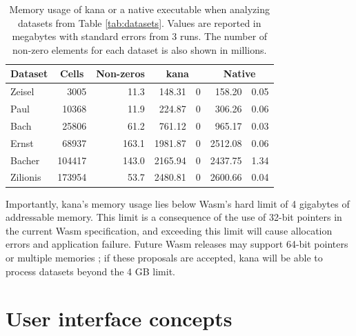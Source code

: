 \documentclass{article}
\begin{document}
\begin{table}
    \caption{Memory usage of kana or a native executable when analyzing datasets from Table \ref{tab:datasets}.
Values are reported in megabytes with standard errors from 3 runs.
The number of non-zero elements for each dataset is also shown in millions.}
\label{tab:memory}
\begin{center}
    \begin{tabular}{l r r r@{ $\pm$ }l r@{ $\pm$ }l}
\hline
        Dataset & \multicolumn{1}{c}{Cells} & \multicolumn{1}{c}{Non-zeros} & \multicolumn{2}{c}{kana} & \multicolumn{2}{c}{Native} \\
\hline
        Zeisel   & 3005  &  11.3 & 148.31 & 0 & 158.20 & 0.05 \\
        Paul     & 10368 &  11.9 & 224.87 & 0 & 306.26 & 0.06 \\
        Bach     & 25806 &  61.2 & 761.12 & 0 & 965.17 & 0.03 \\
        Ernst    & 68937 & 163.1 & 1981.87 & 0 & 2512.08 & 0.06 \\
        Bacher   & 104417& 143.0 & 2165.94 & 0 & 2437.75 & 1.34 \\
        Zilionis & 173954&  53.7 & 2480.81 & 0 & 2600.66 & 0.04 \\
\hline
\end{tabular}
\end{center}
\end{table}

Importantly, kana's memory usage lies below Wasm's hard limit of 4 gigabytes of addressable memory.
This limit is a consequence of the use of 32-bit pointers in the current Wasm specification,
and exceeding this limit will cause allocation errors and application failure.
Future Wasm releases may support 64-bit pointers \cite{wasm64} or multiple memories \cite{wasmmulti};
if these proposals are accepted, kana will be able to process datasets beyond the 4 GB limit.


\section{User interface concepts}
\end{document}
